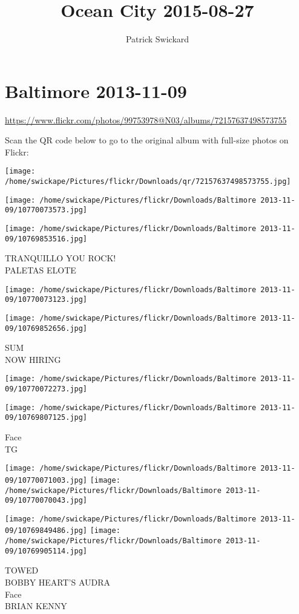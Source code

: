 \documentclass[10pt,letterpaper]{article}
\title{Ocean City 2015-08-27}
\author{Patrick Swickard}
\date{}
\begin{document}
\section*{Baltimore 2013-11-09}

\url{https://www.flickr.com/photos/99753978@N03/albums/72157637498573755}

Scan the QR code below to go to the original album with full-size photos on Flickr:

\texttt{[image: /home/swickape/Pictures/flickr/Downloads/qr/72157637498573755.jpg]}
\pagebreak

\texttt{[image: /home/swickape/Pictures/flickr/Downloads/Baltimore 2013-11-09/10770073573.jpg]}

\vspace{0.25in}
\texttt{[image: /home/swickape/Pictures/flickr/Downloads/Baltimore 2013-11-09/10769853516.jpg]}

TRANQUILLO YOU ROCK!\\
PALETAS ELOTE
\pagebreak

\texttt{[image: /home/swickape/Pictures/flickr/Downloads/Baltimore 2013-11-09/10770073123.jpg]}

\vspace{0.25in}
\texttt{[image: /home/swickape/Pictures/flickr/Downloads/Baltimore 2013-11-09/10769852656.jpg]}

SUM\\
NOW HIRING
\pagebreak

\texttt{[image: /home/swickape/Pictures/flickr/Downloads/Baltimore 2013-11-09/10770072273.jpg]}

\vspace{0.25in}
\texttt{[image: /home/swickape/Pictures/flickr/Downloads/Baltimore 2013-11-09/10769807125.jpg]}

Face\\
TG
\pagebreak

\texttt{[image: /home/swickape/Pictures/flickr/Downloads/Baltimore 2013-11-09/10770071003.jpg]}
\texttt{[image: /home/swickape/Pictures/flickr/Downloads/Baltimore 2013-11-09/10770070043.jpg]}

\texttt{[image: /home/swickape/Pictures/flickr/Downloads/Baltimore 2013-11-09/10769849486.jpg]}
\texttt{[image: /home/swickape/Pictures/flickr/Downloads/Baltimore 2013-11-09/10769905114.jpg]}

TOWED\\
BOBBY HEART'S AUDRA\\
Face\\
BRIAN KENNY
\pagebreak
\end{document}
